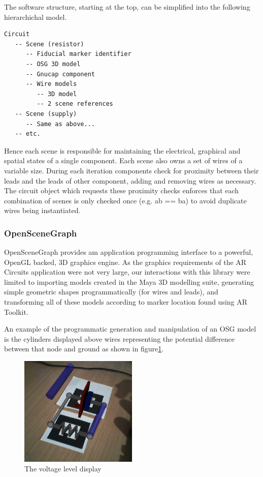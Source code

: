 The software structure, starting at the top, can be simplified into
the following hierarchichal model.

\begin{verbatim}
Circuit
   -- Scene (resistor)
      -- Fiducial marker identifier
      -- OSG 3D model
      -- Gnucap component
      -- Wire models
         -- 3D model
         -- 2 scene references
   -- Scene (supply)
      -- Same as above...
   -- etc.
\end{verbatim}

Hence each scene is responsible for maintaining the electrical, graphical
and spatial states of a single component. Each scene also owns a set of
wires of a variable size. During each iteration components check for
proximity between their leads and the leads of other component, adding
and removing wires as necessary. The circuit object which requests these
proximity checks enforces that each combination of scenes is only checked
once (e.g. ab == ba) to avoid duplicate wires being instantiated.

\subsubsection{OpenSceneGraph}
OpenSceneGraph provides am application programming interface to a powerful,
OpenGL backed, 3D graphics engine. As the graphics requirements of the AR
Circuits application were not very large, our interactions with this
library were limited to importing models created in the Maya 3D modelling suite,
generating simple geometric shapes programmatically (for wires and leads), and
transforming all of these models according to marker location found using AR
Toolkit.

An example of the programmatic generation and manipulation of an OSG model is
the cylinders displayed above wires representing the potential difference
between that node and ground as shown in figure\ref{voltage}.
\begin{figure}
\begin{center}
\includegraphics[width=0.50\textwidth]{voltages}
\end{center}
\caption{The voltage level display}
\label{voltage}
\end{figure}


